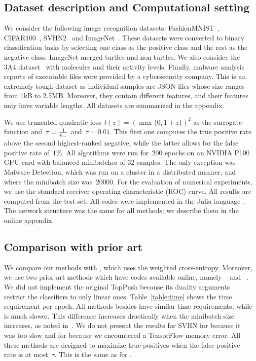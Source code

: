 \subsection{Dataset description and Computational setting}\label{sec:set}

We consider the following image recognition datasets: FashionMNIST~\cite{xiao2017fashionmnist}, CIFAR100~\cite{krizhevsky2009learning}, SVHN2~\cite{netzer2011reading} and ImageNet~\cite{russakovsky2015imagenet}. These datasets were converted to binary classification tasks by selecting one class as the positive class and the rest as the negative class. ImageNet merged turtles and non-turtles. We also consider the 3A4 dataset~\cite{ma2015deep} with molecules and their activity levels. Finally, malware analysis reports of executable files were provided by a cybersecurity company. This is an extremely tough dataset as individual samples are JSON files whose size ranges from 1kB to 2.5MB. Moreover, they contain different features, and their features may have variable lengths. All datasets are summarized in the appendix.

We use truncated quadratic loss~$l(z) = (\max\{0, 1 + z\})^2$ as the surrogate function and~$\tau=\frac{1}{n_{-}}$ and~$\tau=0.01$. This first one computes the true positive rate above the second highest-ranked negative, while the latter allows for the false positive rate of~$1\%$. All algorithms were run for~$200$ epochs on an NVIDIA P100 GPU card with balanced minibatches of 32 samples. The only exception was Malware Detection, which was run on a cluster in a distributed manner, and where the minibatch size was~$20000$. For the evaluation of numerical experiments, we use the standard receiver operating characteristic (ROC) curve. All results are computed from the test set. All codes were implemented in the Julia language~\cite{bezanson2017julia}. The network structure was the same for all methods; we describe them in the online appendix.

\subsection{Comparison with prior art}\label{sec:comparison}

We compare our methods with \BaseLine, which uses the weighted cross-entropy. Moreover, we use two prior art methods which have codes available online, namely \TFCO~\cite{cotter2019optimization,narasimhan2019optimizing} and \APPerf~\cite{fathony2019ap}. We did not implement the original TopPush because its duality arguments restrict the classifiers to only linear ones. Table~\ref{table:time} shows the time requirement per epoch. All methods besides \APPerf have similar time requirements, while \APPerf is much slower. This difference increases drastically when the minibatch size increases, as noted in~\cite{fathony2019ap}. We do not present the results for SVHN for \APPerf because it was too slow and for \TFCO because we encountered a TensorFlow memory error. All these methods are designed to maximize true-positives when the false positive rate is at most~$\tau$. This is the same as for \PatMatNP.

